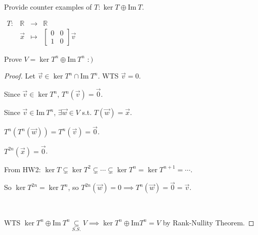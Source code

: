 \documentclass[11pt,fleqn]{book} %
\begin{document}
\begin{example}
    Provide counter examples of $T: \ker T \oplus \mathrm{Im}~T$. 
    
    \item $\begin{matrix} T: &\mathbb{R} &\to &\mathbb{R} \\ &\vec{x} &\mapsto &\begin{bmatrix} 0 &0 \\ 1 &0 \end{bmatrix} \vec{v} \end{matrix}$
\end{example}

\begin{example}
    Prove $V = \ker T^n \oplus \mathrm{Im}~T^n$ $:)$
    
    \begin{proof}
        Let $\vec{v} \in \ker T^n \cap \mathrm{Im}~T^n$. 
        WTS $\vec{v} = 0$. 
        
        Since $\vec{v} \in \ker T^n$, $T^n(\vec{v}) = \vec{0}$. 
        
        Since $\vec{v} \in \mathrm{Im}~T^n$, $\exists \vec{w} \in V$ s.t. $T(\vec{w}) = \vec{x}$. 
        
        $T^n(T^n(\vec{w})) = T^n(\vec{v}) = \vec{0}$. 
        
        $T^{2n}(\vec{x}) = \vec{0}$. 
        
        From HW2: $\ker T \subsetneq \ker T^2 \subsetneq \cdots \subsetneq \ker T^n = \ker T^{n+1} = \cdots $. 
        
        So $\ker T^{2n} = \ker T^n$, so $T^{2n}(\vec{w}) = 0 \implies T^n(\vec{w}) = \vec{0} = \vec{v}$.
        
        {~~~~}
        
        WTS $\ker T^n \oplus \mathrm{Im}~T^n \underset{S.S.}{\subseteq} V \implies \ker T^n \oplus \mathrm{Im}T^n = V$ by Rank-Nullity Theorem. 
    \end{proof}
\end{example}
\end{document}
